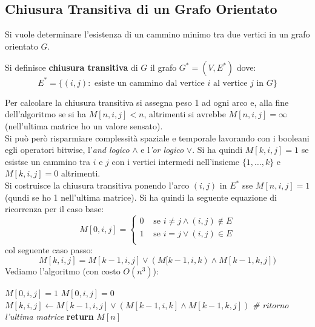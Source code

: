 \documentclass[a4paper,12pt, oneside]{book}
\begin{document}
\subsection{Chiusura Transitiva di un Grafo Orientato}
Si vuole determinare l'esistenza di un cammino minimo tra due vertici
in un grafo orientato $G$.
\begin{definizione}
  Si definisce \textbf{chiusura transitiva} di $G$ il grafo
  $G^{*}=(V,E^{*})$ dove:
  \[E^{*}=\{(i,j):\mbox{ esiste un cammino dal vertice } i \mbox{ al
      vertice }j \mbox{ in } G\}\]
\end{definizione}
Per calcolare la chiusura transitiva si assegna peso 1 ad ogni arco e,
alla fine dell'algoritmo se si ha $M[n,i,j]<n$, altrimenti si avrebbe
$M[n,i,j]=\infty$ (nell'ultima matrice ho un valore sensato).\\
Si può però risparmiare complessità spaziale e temporale lavorando con
i booleani egli operatori bitwise, l'\textit{and logico} $\wedge$ e
l\textit{'or logico} $\vee$. Si ha quindi $M[k,i,j]=1$ se esistse un
cammino tra $i$ e $j$ con i vertici intermedi nell'insieme
$\{1,\ldots,k\}$ e $M[k,i,j]=0$ altrimenti.\\
Si costruisce la chiusura transitiva ponendo l'arco $(i,j)$ in $E^{*}$
sse $M[n,i,j]=1$ (qundi se ho 1 nell'ultima matrice). Si ha quindi la
seguente equazione di ricorrenza per il caso base:
\[M[0,i,j]=
  \begin{cases}
    0 & \mbox{ se }i\neq j\wedge (i,j)\not\in E\\
    1 & \mbox{ se }i= j\vee (i,j)\in E\\
  \end{cases}
\]
col seguente caso passo:
\[M[k,i,j]=M[k-1,i,j]\vee (M[k-1,i,k)\wedge M[k-1,k,j])\]
Vediamo l'algoritmo (con costo $O(n^3)$):
\begin{shaded}
   \begin{algorithmic}
    \State $M[0,i,j]=1$
    \Else
    \State $M[0,i,j]=0$
    \EndIf
    \EndFor
    \EndFor
    \State $M[k,i,j]\gets M[k-1,i,j]\vee (M[k-1,i,k]\wedge M[k-1,k,j])$
    \EndFor
    \EndFor
    \EndFor
    \State \textit{\# ritorno l'ultima matrice }
    \State \textbf{return} $M[n]$
    \EndFunction
  \end{algorithmic}
\end{shaded}
\end{document}
